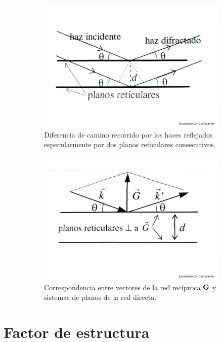 \begin{figure}[h!] \centering
\begin{subfigure}{0.43\linewidth} \centering
    \includegraphics[scale=0.3]{Cuerpo/Ch_02/Fotos_libro 6.pdf}
    \caption{Diferencia de camino recorrido por los haces reflejados especularmente por dos planos reticulares consecutivos.}
    \label{Fig:02-06}
\end{subfigure}    
\begin{subfigure}{0.43\linewidth} \centering
    \includegraphics[scale=0.3]{Cuerpo/Ch_02/Fotos_libro 7.pdf}
    \caption{Correspondencia entre vectores de la red recíproca $\mathbf{G}$ y sistemas de planos de la red directa.}
    \label{Fig:02-07}
\end{subfigure}
\caption{}
\end{figure}
\section{Factor de estructura}

